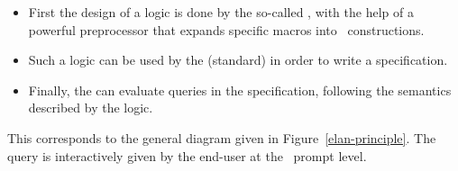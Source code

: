 \begin{itemize}
\item  First   the  design of  a    logic is  done  by  the  so-called
        , with the help of a powerful preprocessor that
        expands specific macros into \elan\ constructions.
\item Such a logic can be used by the (standard)  in order
        to write a specification.
\item Finally,  the     can  evaluate  queries  in   the
        specification, following the semantics described by the logic.
\end{itemize}
This corresponds to the general diagram given in Figure~\ref{elan-principle}.
The query is interactively given by the end-user at the \elan\ prompt
level.

\begin{figure}[hbt]
\begin{center}
\end{center}
\end{figure}



